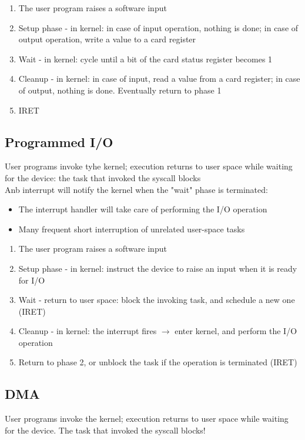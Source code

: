     \begin{enumerate}
        \item The user program raises a software input
        \item Setup phase - in kernel: in case of input operation, nothing is done; in case of output operation, write a value to a card register
        \item Wait - in kernel: cycle until a bit of the card status register becomes 1
        \item Cleanup - in kernel: in case of input, read a value from a card register; in case of output, nothing is done. Eventually return to phase 1
        \item IRET
    \end{enumerate}
    \subsection{Programmed I/O}
    User programs invoke tyhe kernel; execution returns to user space while waiting for the device: the task that invoked the syscall blocks\\
    Anb interrupt will notify the kernel when the "wait" phase is terminated:
    \begin{itemize}
        \item The interrupt handler will take care of performing the I/O operation
        \item Many frequent short interruption of unrelated user-space tasks
    \end{itemize}

    \begin{enumerate}
        \item The user program raises a software input
        \item Setup phase - in kernel: instruct the device to raise an input when it is ready for I/O
        \item Wait - return to user space: block the invoking task, and schedule a new one (IRET)
        \item Cleanup - in kernel: the interrupt fires $\rightarrow$ enter kernel, and perform the I/O operation
        \item Return to phase 2, or unblock the task if the operation is terminated (IRET)
    \end{enumerate}
\subsection{DMA}
User programs invoke the kernel; execution returns to user space while waiting for the device. The task that invoked the syscall blocks!

